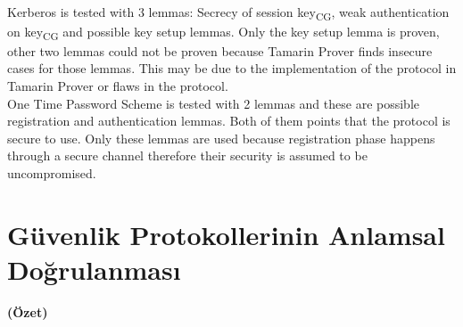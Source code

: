 \documentclass[a4paper, 12pt, titlepage]{article}
\begin{document}
\bigskip
\\Kerberos is tested with 3 lemmas: Secrecy of session key\textsubscript{CG}, weak authentication on key\textsubscript{CG} and possible key setup lemmas. Only the key setup lemma is proven, other two lemmas could not be proven because Tamarin Prover finds insecure cases for those lemmas. This may be due to the implementation of the protocol in Tamarin Prover or flaws in the protocol.
\bigskip
\\One Time Password Scheme is tested with 2 lemmas and these are possible registration and authentication lemmas. Both of them points that the protocol is secure to use. Only these lemmas are used because registration phase happens through a secure channel therefore their security is assumed to be uncompromised.

\newpage
\section*{Güvenlik Protokollerinin Anlamsal Doğrulanması}
\centerline{\large\bfseries (Özet)}
\end{document}
